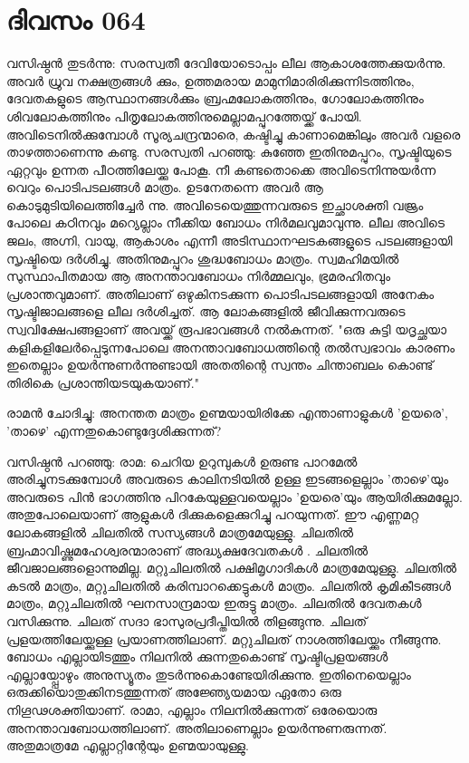 \newpage
\section{ദിവസം 064}


വസിഷ്ഠന്‍ തുടര്‍ന്നു: സരസ്വതീ ദേവിയോടൊപ്പം ലീല ആകാശത്തേക്കുയര്‍ന്നു. അവര്‍ ധ്രുവ നക്ഷത്രങ്ങള്‍ ക്കും, ഉത്തമരായ മാമുനിമാരിരിക്കുന്നിടത്തിനും, ദേവതകളുടെ ആസ്ഥാനങ്ങള്‍ക്കും ബ്രഹ്മലോകത്തിനും, ഗോലോകത്തിനും ശിവലോകത്തിനും പിതൃലോകത്തിനുമെല്ലാമപ്പുറത്തേയ്ക്ക്‌ പോയി. അവിടെനില്‍ക്കുമ്പോള്‍ സൂര്യചന്ദ്രന്മാരെ, കഷ്ടിച്ചു കാണാമെങ്കിലും അവര്‍ വളരെ താഴത്താണെന്നു കണ്ടു. സരസ്വതി പറഞ്ഞു: കുഞ്ഞേ ഇതിനുമപ്പുറം, സൃഷ്ടിയുടെ ഏറ്റവും ഉന്നത പീഠത്തിലേയ്ക്കു പോകൂ. നീ കണ്ടതൊക്കെ അവിടെനിന്നുയര്‍ന്ന വെറും പൊടിപടലങ്ങള്‍ മാത്രം. ഉടനേതന്നെ അവര്‍ ആ കൊടുമുടിയിലെത്തിച്ചേര്‍ ന്നു. അവിടെയെത്തുന്നവരുടെ ഇച്ഛാശക്തി വജ്രം പോലെ കഠിനവും മറ്യെല്ലാം നീക്കിയ ബോധം നിര്‍മലവുമാവുന്നു. ലീല അവിടെ ജലം, അഗ്നി, വായു, ആകാശം എന്നീ അടിസ്ഥാനഘടകങ്ങളുടെ പടലങ്ങളായി സൃഷ്ടിയെ ദര്‍ശിച്ചു. അതിനുമപ്പുറം ശുദ്ധബോധം മാത്രം. സ്വമഹിമയില്‍ സുസ്ഥാപിതമായ ആ അനന്താവബോധം നിര്‍മ്മലവും, ഭ്രമരഹിതവും പ്രശാന്തവുമാണ്‌. അതിലാണ്‌ ഒഴുകിനടക്കുന്ന പൊടിപടലങ്ങളായി അനേകം സൃഷ്ടിജാലങ്ങളെ ലീല ദര്‍ശിച്ചത്‌. ആ ലോകങ്ങളില്‍ ജീവിക്കുന്നവരുടെ സ്വവിക്ഷേപങ്ങളാണ്‌ അവയ്ക്ക്‌ രൂപഭാവങ്ങള്‍ നല്‍കുന്നത്‌. "ഒരു കുട്ടി യദൃച്ഛയാ കളികളിലേര്‍പ്പെടുന്നപോലെ അനന്താവബോധത്തിന്റെ തല്‍സ്വഭാവം കാരണം ഇതെല്ലാം ഉയര്‍ന്നുണര്‍ന്നുണ്ടായി അതതിന്റെ സ്വന്തം ചിന്താബലം കൊണ്ട്‌ തിരികെ പ്രശാന്തിയടയുകയാണ്‌."

രാമന്‍ ചോദിച്ചു: അനന്തത മാത്രം ഉണ്മയായിരിക്കേ എന്താണാളുകള്‍ 'ഉയരെ', 'താഴെ' എന്നതുകൊണ്ടുദ്ദേശിക്കുന്നത്‌?

വസിഷ്ഠന്‍ പറഞ്ഞു: രാമ: ചെറിയ ഉറുമ്പുകള്‍ ഉരുണ്ട പാറമേല്‍ അരിച്ചുനടക്കുമ്പോള്‍ അവരുടെ കാലിനടിയില്‍ ഉള്ള ഇടങ്ങളെല്ലാം 'താഴെ'യും അവരുടെ പിന്‍ ഭാഗത്തിനു പിറകേയുള്ളവയെല്ലാം 'ഉയരെ'യും ആയിരിക്കുമല്ലോ. അതുപോലെയാണ്‌ ആളുകള്‍ ദിക്കുകളെക്കുറിച്ചു പറയുന്നത്‌. ഈ എണ്ണമറ്റ ലോകങ്ങളില്‍ ചിലതില്‍ സസ്യങ്ങള്‍ മാത്രമേയുള്ളു. ചിലതില്‍ ബ്രഹ്മാവിഷ്ണുമഹേശ്വരന്മാരാണ്‌ അദ്ധ്യക്ഷദേവതകള്‍ . ചിലതില്‍ ജീവജാലങ്ങളൊന്നുമില്ല. മറ്റുചിലതില്‍ പക്ഷിമൃഗാദികള്‍ മാത്രമേയുള്ളു. ചിലതില്‍ കടല്‍ മാത്രം, മറ്റുചിലതില്‍ കരിമ്പാറക്കെട്ടുകള്‍ മാത്രം. ചിലതില്‍ കൃമികീടങ്ങള്‍ മാത്രം, മറ്റുചിലതില്‍ ഘനസാന്ദ്രമായ ഇരുട്ടു മാത്രം. ചിലതില്‍ ദേവതകള്‍ വസിക്കുന്നു. ചിലത്‌ സദാ ഭാസുരപ്രദീപ്തിയില്‍ തിളങ്ങുന്നു. ചിലത്‌ പ്രളയത്തിലേയ്ക്കുള്ള പ്രയാണത്തിലാണ്‌. മറ്റുചിലത്‌ നാശത്തിലേയ്ക്കും നീങ്ങുന്നു. ബോധം എല്ലായിടത്തും നിലനില്‍ ക്കുന്നതുകൊണ്ട്‌ സൃഷ്ടിപ്രളയങ്ങള്‍ എല്ലായ്പ്പോഴും അനുസ്യൂതം തുടര്‍ന്നുകൊണ്ടേയിരിക്കുന്നു. ഇതിനെയെല്ലാം ഒരുക്കിയൊതുക്കിനടത്തുന്നത്‌ അജ്ഞ്യേയമായ ഏതോ ഒരു നിഗൂഢശക്തിയാണ്‌. രാമാ, എല്ലാം നിലനില്‍ക്കുന്നത്‌ ഒരേയൊരു അനന്താവബോധത്തിലാണ്‌. അതിലാണെല്ലാം ഉയര്‍ന്നുണരുന്നത്‌. അതുമാത്രമേ എല്ലാറ്റിന്റേയും ഉണ്മയായുള്ളു.

